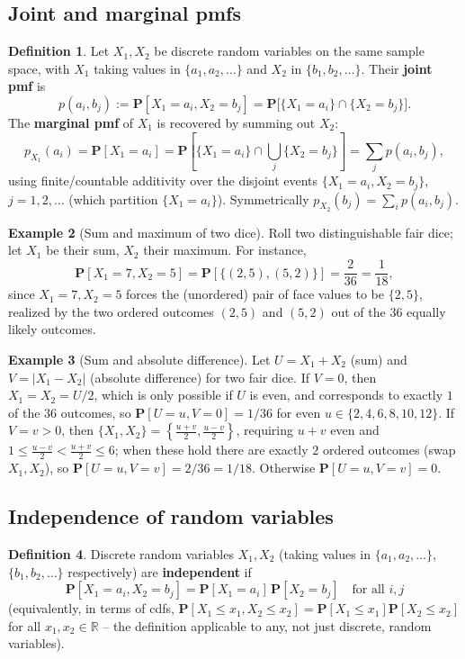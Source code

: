 \documentclass[11pt]{article}
\theoremstyle{definition}
\newtheorem{definition}{Definition}[section]
\newtheorem{example}[definition]{Example}
\theoremstyle{plain}
\theoremstyle{remark}
\newcommand{\R}{\mathbb{R}}
\begin{document}
\subsection{Joint and marginal pmfs}

\begin{definition}
Let $X_1,X_2$ be discrete random variables on the same sample space, with $X_1$ taking values in
$\{a_1,a_2,\dots\}$ and $X_2$ in $\{b_1,b_2,\dots\}$. Their \textbf{joint pmf} is
\[
p(a_i,b_j) := \mathbf{P}[X_1=a_i, X_2=b_j] = \mathbf{P}\big[\{X_1=a_i\}\cap\{X_2=b_j\}\big].
\]
The \textbf{marginal pmf} of $X_1$ is recovered by summing out $X_2$:
\[
p_{X_1}(a_i) = \mathbf{P}[X_1=a_i] = \mathbf{P}\!\left[\{X_1=a_i\}\cap\bigcup_j\{X_2=b_j\}\right]
= \sum_j p(a_i,b_j),
\]
using finite/countable additivity over the disjoint events $\{X_1=a_i,X_2=b_j\}$, $j=1,2,\dots$
(which partition $\{X_1=a_i\}$). Symmetrically $p_{X_2}(b_j)=\sum_i p(a_i,b_j)$.
\end{definition}

\begin{example}[Sum and maximum of two dice]
Roll two distinguishable fair dice; let $X_1$ be their sum, $X_2$ their maximum. For instance,
\[
\mathbf{P}[X_1=7, X_2=5] = \mathbf{P}[\{(2,5),(5,2)\}] = \frac{2}{36} = \frac{1}{18},
\]
since $X_1=7, X_2=5$ forces the (unordered) pair of face values to be $\{2,5\}$, realized by the
two ordered outcomes $(2,5)$ and $(5,2)$ out of the $36$ equally likely outcomes.
\end{example}

\begin{example}[Sum and absolute difference]
Let $U=X_1+X_2$ (sum) and $V=|X_1-X_2|$ (absolute difference) for two fair dice. If $V=0$, then
$X_1=X_2=U/2$, which is only possible if $U$ is even, and corresponds to exactly $1$ of the $36$
outcomes, so $\mathbf{P}[U=u,V=0] = 1/36$ for even $u\in\{2,4,6,8,10,12\}$. If $V=v>0$, then
$\{X_1,X_2\}=\left\{\frac{u+v}{2},\frac{u-v}{2}\right\}$, requiring $u+v$ even and
$1\le \frac{u-v}{2} < \frac{u+v}{2}\le 6$; when these hold there are exactly $2$ ordered outcomes
(swap $X_1,X_2$), so $\mathbf{P}[U=u,V=v]=2/36=1/18$. Otherwise $\mathbf{P}[U=u,V=v]=0$.
\end{example}

\subsection{Independence of random variables}

\begin{definition}
Discrete random variables $X_1,X_2$ (taking values in $\{a_1,a_2,\dots\}$, $\{b_1,b_2,\dots\}$
respectively) are \textbf{independent} if
\[
\mathbf{P}[X_1=a_i,X_2=b_j] = \mathbf{P}[X_1=a_i]\,\mathbf{P}[X_2=b_j] \quad \text{for all } i,j
\]
(equivalently, in terms of cdfs, $\mathbf{P}[X_1\le x_1,X_2\le x_2]=\mathbf{P}[X_1\le
x_1]\mathbf{P}[X_2\le x_2]$ for all $x_1,x_2\in\R$ -- the definition applicable to any, not just
discrete, random variables).
\end{definition}
\end{document}
